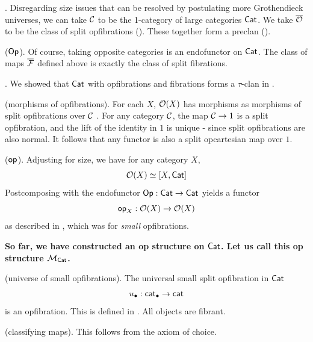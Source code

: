 \begin{example}\label{ex:ACM-of-opfibrations}
  .
  Disregarding size issues that can be resolved by postulating
  more Grothendieck universes,
  we can take $\CC$ to be the 1-category of large categories $\Cat$.
  We take $\opfib$ to be the class of split opfibrations ().
  These together form a preclan ().

   ($\Op$).
  Of course, taking opposite categories is an endofunctor on $\Cat$.
  The class of maps $\fib$ defined above is exactly the class of split fibrations.

  .
  We showed that $\Cat$ with opfibrations and fibrations forms a $\tau$-clan in .

   (morphisms of opfibrations).
  For each $X$, $\opfibcart(X)$ has morphisms as morphisms of
  split opfibrations over $\CC$ .
  For any category $\CC$, the map $\CC \to 1$ is a split opfibration,
  and the lift of the identity in $1$ is unique -
  since split opfibrations are also {normal}.
  It follows that any functor is also a
  split opcartesian map over $1$.

   ($\vOp$).
  Adjusting  for size,
  we have for any category $X$,
  \[\opfibcart(X) \simeq [X,\Cat]\]
  Postcomposing with the endofunctor $\Op : \Cat \to \Cat$
  yields a functor
  \[ \vOp[X] : \opfibcart(X) \to \opfibcart(X) \]
  as described in ,
  which was for \emph{small} opfibrations.

  {\bf So far, we have constructed an op structure on $\Cat$.
  Let us call this op structure $\MM_\Cat$.}

   (universe of small opfibrations).
  The universal small split opfibration in $\Cat$
  \[\ulow : \pcat \to \cat\]
  is an opfibration.
  This is defined in .
  All objects are fibrant.

   (classifying maps).
  This follows from the axiom of choice.


\end{example}
